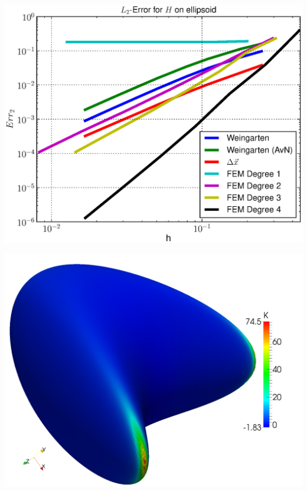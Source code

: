 \documentclass{beamer}
\begin{document}
\begin{frame}
\begin{overprint}
\begin{minipage}[t]{0.49\textwidth}
          \end{minipage}\hfill
          \begin{minipage}[t]{0.49\textwidth}
            \centering\includegraphics[width=\textwidth]{bilder/Curvature/heineC/ErrHL2.eps}
          \end{minipage}
          \begin{minipage}[t]{0.49\textwidth}
              \centering\includegraphics[width=\textwidth]{bilder/Curvature/heineB/K250k.png}
          \end{minipage}\hfill
          \begin{minipage}[t]{0.49\textwidth}

\end{minipage}
\end{overprint}
\end{frame}
\end{document}
